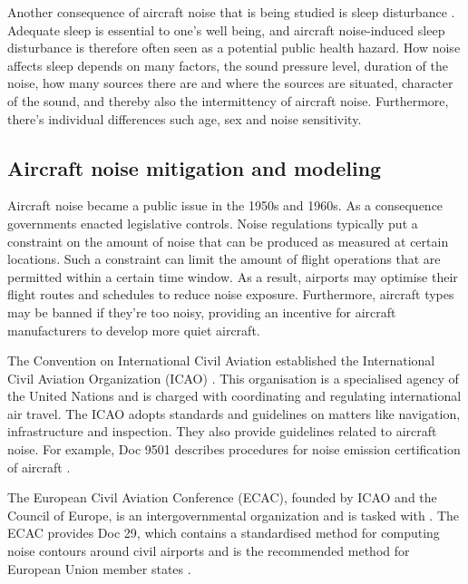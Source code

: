 Another consequence of aircraft noise that is being studied is sleep disturbance
\cite{Michaud2007}. Adequate sleep is essential to one's well being, and
aircraft noise-induced sleep disturbance is therefore often seen as a potential
public health hazard.
How noise affects sleep depends on many factors, the sound pressure level,
duration of the noise, how many sources there are and where the sources are situated,
character of the sound, and thereby also the intermittency of aircraft noise.
Furthermore, there's individual differences such age, sex and noise sensitivity.


\subsection{Aircraft noise mitigation and modeling}
Aircraft noise became a public issue in the 1950s and 1960s. As a consequence
governments enacted legislative controls. Noise regulations typically put a
constraint on the amount of noise that can be produced as measured at certain
locations. Such a constraint can limit the amount of flight operations that are
permitted within a certain time window. As a result, airports may optimise their
flight routes and schedules to reduce noise exposure. Furthermore, aircraft
types may be banned if they're too noisy, providing an incentive for
aircraft manufacturers to develop more quiet aircraft.


The Convention on International Civil Aviation established the International
Civil Aviation Organization (ICAO) \cite{ICAO2017}. This organisation is a
specialised agency of the United Nations and is charged with coordinating and
regulating international air travel. The ICAO adopts standards and guidelines on
matters like navigation, infrastructure and inspection. They also provide
guidelines related to aircraft noise. For example, Doc 9501 describes procedures
for noise emission certification of aircraft \cite{ICAO_9501}.


The European Civil Aviation Conference (ECAC), founded by ICAO and the Council
of Europe, is an intergovernmental organization and is tasked with  \cite{ECAC2017}. The ECAC provides Doc 29, which
contains a standardised method for computing noise contours around civil
airports \cite{Doc29_fourth_2016} and is the recommended method for European
Union member states \cite{directive_2002_49_ec}.

